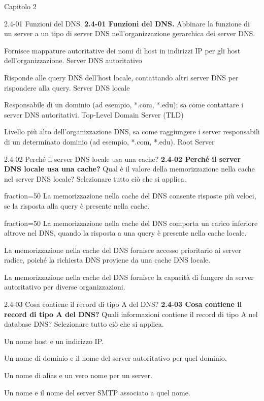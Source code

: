 \documentclass[11pt]{article}
\begin{document}
\begin{quiz}{Capitolo 2}
\begin{matching}[points=1,shuffle]{2.4-01 Funzioni del DNS.}
\textbf{2.4-01 Funzioni del DNS.} 
Abbinare la funzione di un server a un tipo di server DNS nell'organizzazione gerarchica dei server DNS.
\item Fornisce mappature autoritative dei nomi di host in indirizzi IP per gli host dell'organizzazione. \answer Server DNS autoritativo
\item Risponde alle query DNS dell'host locale, contattando altri server DNS per rispondere alla query. \answer Server DNS locale
\item Responsabile di un dominio (ad esempio, *.com, *.edu); sa come contattare i server DNS autoritativi. \answer Top-Level Domain Server (TLD)
\item Livello più alto dell'organizzazione DNS, sa come raggiungere i server responsabili di un determinato dominio (ad esempio, *.com, *.edu). \answer Root Server
\end{matching}
    
\begin{multi}[points=1,shuffle,multiple]{2.4-02 Perché il server DNS locale usa una cache?}
\textbf{2.4-02 Perché il server DNS locale usa una cache?} 
Qual è il valore della memorizzazione nella cache nel server DNS locale? Selezionare tutto ciò che si applica.

\item[fraction=50] La memorizzazione nella cache del DNS consente risposte più veloci, se la risposta alla query è presente nella cache.
\item[fraction=50] La memorizzazione nella cache del DNS comporta un carico inferiore altrove nel DNS, quando la risposta a una query è presente nella cache locale.
\item La memorizzazione nella cache del DNS fornisce accesso prioritario ai server radice, poiché la richiesta DNS proviene da una cache DNS locale.
\item La memorizzazione nella cache del DNS fornisce la capacità di fungere da server autoritativo per diverse organizzazioni.
\end{multi}

\begin{multi}[points=1,shuffle,multiple]{2.4-03 Cosa contiene il record di tipo A del DNS?}
\textbf{2.4-03 Cosa contiene il record di tipo A del DNS?} 
Quali informazioni contiene il record di tipo A nel database DNS? Selezionare tutto ciò che si applica.
\item* Un nome host e un indirizzo IP.
\item Un nome di dominio e il nome del server autoritativo per quel dominio.
\item Un nome di alias e un vero nome per un server.
\item Un nome e il nome del server SMTP associato a quel nome.
\end{multi}



\end{quiz}
\end{document}

